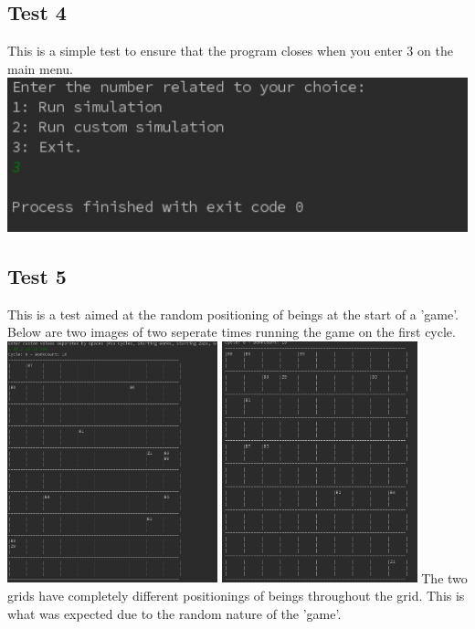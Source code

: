 \documentclass[12pt]{article}
\begin{document}
\subsection{Test 4}
This is a simple test to ensure that the program closes when you enter 3 on the main menu.\\
\includegraphics[width=15cm]{test4}

\subsection{Test 5}
This is a test aimed at the random positioning of beings at the start of a 'game'. Below are two images of two seperate times running the game on the first cycle.\\
\includegraphics[height=7cm]{test5a}
\includegraphics[height=7cm]{test5b}
 The two grids have completely different positionings of beings throughout the grid. This is what was expected due to the random nature of the 'game'.
\end{document}
